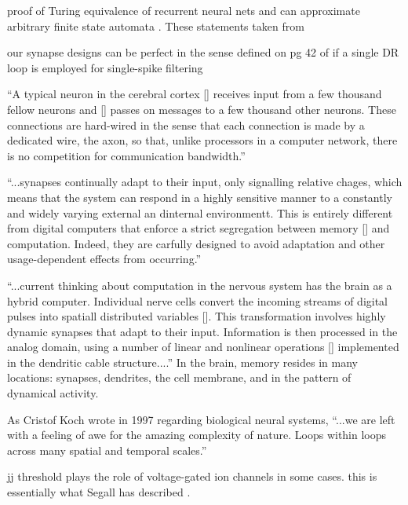\documentclass[twocolumn]{article}
\begin{document}
\vspace{3em}
proof of Turing equivalence of recurrent neural nets \cite{kisi1996} and can approximate arbitrary finite state automata \cite{omgi1994}. These statements taken from \cite{vesc2007}

\vspace{3em}
our synapse designs can be perfect in the sense defined on pg 42 of \cite{li1997} if a single DR loop is employed for single-spike filtering

\vspace{3em}
``A typical neuron in the cerebral cortex [] receives input from a few thousand fellow neurons and [] passes on messages to a few thousand other neurons. These connections are hard-wired in the sense that each connection is made by a dedicated wire, the axon, so that, unlike processors in a computer network, there is no competition for communication bandwidth.'' \cite{ko1997}

\vspace{3em}
``...synapses continually adapt to their input, only signalling relative chages, which means that the system can respond in a highly sensitive manner to a constantly and widely varying external an dinternal environmentt. This is entirely different from digital computers that enforce a strict segregation between memory [] and computation. Indeed, they are carfully designed to avoid adaptation and other usage-dependent effects from occurring.'' \cite{ko1997}

\vspace{3em}
``...current thinking about computation in the nervous system has the brain as a hybrid computer. Individual nerve cells convert the incoming streams of digital pulses into spatiall distributed variables []. This transformation involves highly dynamic synapses that adapt to their input. Information is then processed in the analog domain, using a number of linear and nonlinear operations [] implemented in the dendritic cable structure....'' \cite{ko1997} In the brain, memory resides in many locations: synapses, dendrites, the cell membrane, and in the pattern of dynamical activity. 

\vspace{3em}
As Cristof Koch wrote in 1997 regarding biological neural systems, ``...we are left with a feeling of awe for the amazing complexity of nature. Loops within loops across many spatial and temporal scales.'' \cite{ko1997} 

\vspace{3em}
jj threshold plays the role of voltage-gated ion channels in some cases. this is essentially what Segall has described \cite{crsc2010}.




\end{document}
